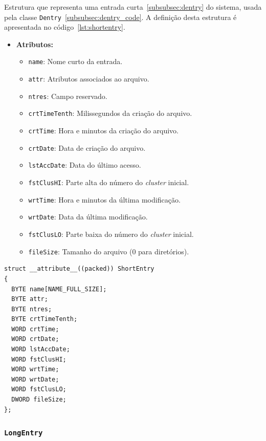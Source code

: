 \documentclass[
    12pt,				%
    oneside,   	        %
    a4paper,			%
    english,			%
    french,				%
    spanish,			%
    brazil,				%
    ]{pacotes/abntex2}
\begin{document}
Estrutura que representa uma entrada curta~\ref{subsubsec:dentry} do sistema, usada pela classe \texttt{Dentry}~\ref{subsubsec:dentry_code}. A definição desta estrutura é apresentada no código~\ref{lst:shortentry}.

\begin{itemize}
    \item \textbf{Atributos:}
        \begin{itemize}
            \item \texttt{name}: Nome curto da entrada.
            \item \texttt{attr}: Atributos associados ao arquivo.
            \item \texttt{ntres}: Campo reservado.
            \item \texttt{crtTimeTenth}: Milissegundos da criação do arquivo.
            \item \texttt{crtTime}: Hora e minutos da criação do arquivo.
            \item \texttt{crtDate}: Data de criação do arquivo.
            \item \texttt{lstAccDate}: Data do último acesso.
            \item \texttt{fstClusHI}: Parte alta do número do \textit{cluster} inicial.
            \item \texttt{wrtTime}: Hora e minutos da última modificação.
            \item \texttt{wrtDate}: Data da última modificação.
            \item \texttt{fstClusLO}: Parte baixa do número do \textit{cluster} inicial.
            \item \texttt{fileSize}: Tamanho do arquivo (0 para diretórios).
        \end{itemize}
\end{itemize}

\begin{lstlisting}[caption={Estrutura que representa uma entrada curta no sistema de arquivos}, label={lst:shortentry}] 
struct __attribute__((packed)) ShortEntry
{
  BYTE name[NAME_FULL_SIZE];
  BYTE attr; 
  BYTE ntres;
  BYTE crtTimeTenth;
  WORD crtTime; 
  WORD crtDate; 
  WORD lstAccDate;
  WORD fstClusHI; 
  WORD wrtTime;
  WORD wrtDate;
  WORD fstClusLO;
  DWORD fileSize;
};
\end{lstlisting}

\subsubsection{\texttt{LongEntry}}
\label{subsubsec:long_entry}
\end{document}
